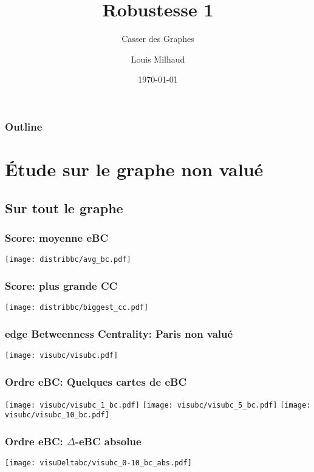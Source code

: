 \documentclass[aspectratio=169]{beamer}
\title{Robustesse 1}
\subtitle{Casser des Graphes}
\author{Louis Milhaud}
\institute{Complex Networks - LIP6}
\date{\today}
\begin{document}
    \begin{frame}
        \titlepage
    \end{frame}

    \begin{frame}
        \frametitle{Outline}
        \tableofcontents
    \end{frame}

    \section{Étude sur le graphe non valué}
    \subsection{Sur tout le graphe}
    \begin{frame}
        \frametitle{Score: moyenne eBC}
        \centering
        \texttt{[image: distribbc/avg\_bc.pdf]}
    \end{frame}
    \begin{frame}
        \frametitle{Score: plus grande CC}
        \centering
        \texttt{[image: distribbc/biggest\_cc.pdf]}
    \end{frame}

    \begin{frame}
        \frametitle{edge Betweenness Centrality: Paris non valué}
        \centering
        \texttt{[image: visubc/visubc.pdf]}
    \end{frame}
    \begin{frame}
        \frametitle{Ordre eBC: Quelques cartes de eBC}
        \texttt{[image: visubc/visubc\_1\_bc.pdf]}
        \texttt{[image: visubc/visubc\_5\_bc.pdf]}
        \texttt{[image: visubc/visubc\_10\_bc.pdf]}
    \end{frame}

    \begin{frame}
        \centering
        \frametitle{Ordre eBC: $\Delta$-eBC absolue}
        \texttt{[image: visuDeltabc/visubc\_0-10\_bc\_abs.pdf]}
    \end{frame}
\end{document}
